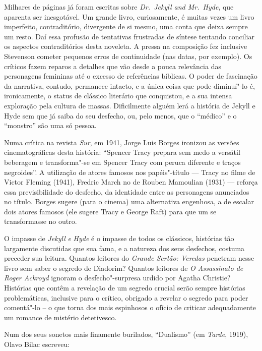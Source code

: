 Milhares de páginas já foram escritas sobre \textit{Dr.~Jekyll and Mr.~Hyde}, 
que aparenta ser inesgotável. Um grande livro, curiosamente, é muitas 
vezes um livro imperfeito, contraditório, divergente de si mesmo, uma 
conta que deixa sempre um resto.  Daí essa profusão de tentativas frustradas 
de síntese tentando conciliar os aspectos contraditórios desta noveleta.  
A pressa na composição fez inclusive Stevenson cometer pequenos erros de 
continuidade (nas datas, por exemplo). Os críticos fazem reparos a detalhes 
que vão desde a pouca relevância das personagens femininas até o excesso de 
referências bíblicas.  O poder de fascinação da narrativa, contudo, permanece 
intacto, e a única coisa que pode diminuí"-lo é, ironicamente, o status de clássico 
literário que conquistou, e a sua intensa exploração pela cultura de massas. 
Dificilmente alguém lerá a história de Jekyll e Hyde sem que já saiba do seu desfecho, 
ou, pelo menos, que o “médico” e o “monstro” são uma só pessoa.

Numa crítica na revista \textit{Sur}, em 1941, Jorge Luis Borges
ironizou as versões cinematográficas desta história: “Spencer Tracy
prepara sem medo a versátil beberagem e transforma"-se em Spencer Tracy
com peruca diferente e traços negroides”.  A utilização de atores
famosos nos papéis"-título --- Tracy no filme de Victor Fleming (1941),
Fredric March no de Rouben Mamoulian (1931) --- reforça essa
previsibilidade do desfecho, da identidade entre as personagens
anunciados no título. Borges sugere (para o cinema) uma alternativa
engenhosa, a de escalar dois atores famosos (ele sugere Tracy e George
Raft) para que um se transformasse no outro.  

O impasse de \textit{Jekyll }\textit{e}\textit{ Hyde} é o impasse de
todos os clássicos, histórias tão largamente discutidas que sua fama, e
a natureza dos seus desfechos, costuma preceder sua leitura.  Quantos
leitores do \textit{Grande Sertão: Veredas} penetram nesse livro sem
saber o segredo de Diadorim?  Quantos leitores de \textit{O Assassinato
de Roger Ackroyd} ignoram o desfecho"-surpresa urdido por Agatha
\mbox{Christie?}  Histórias que contêm a revelação de um segredo crucial serão
sempre histórias problemáticas, inclusive para o crítico, obrigado a
revelar o segredo para poder comentá"-lo – o que torna dos mais
espinhosos o ofício de criticar adequadamente um romance de mistério
detetivesco.

Num dos seus sonetos mais finamente burilados, “Dualismo” (em
\textit{Tarde}, 1919), Olavo Bilac escreveu:


